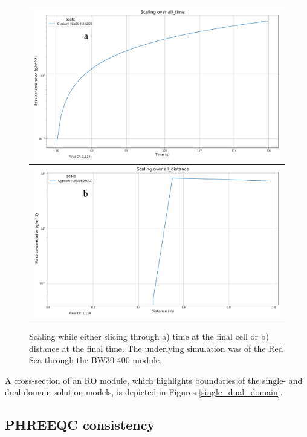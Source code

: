 \begin{supplementary}
\begin{figure}
    \centering
    \begin{tabular}{c}
        \includegraphics[width=\linewidth]{images/ROSSpy/sensitivity_analyses/simulation_perspective/all_time.png} 
        \\ \midrule
        \includegraphics[width=\linewidth]{images/ROSSpy/sensitivity_analyses/simulation_perspective/all_distance.png} 
    \end{tabular}
    \caption{
        Scaling while either slicing through a) time at the final cell or b) distance at the final time. The underlying simulation was of the Red Sea through the BW30-400 module.
    }
    \label{scaling_perspectives}
\end{figure}

A cross-section of an RO module, which highlights boundaries of the single- and dual-domain solution models, is depicted in Figures \ref{single_dual_domain}.

\subsection{PHREEQC consistency}


\end{supplementary}
